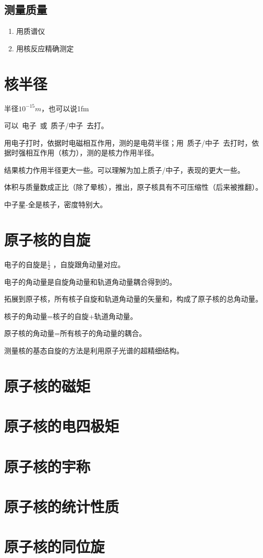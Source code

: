 \subsection{测量质量}

\begin{enumerate}
    \item 用质谱仪
    \item 用核反应精确测定
\end{enumerate}

\section{核半径}

半径$10^{-15}m$，也可以说1fm

可以~电子~或~质子/中子~去打。

用电子打时，依据时电磁相互作用，测的是电荷半径；用~质子/中子~去打时，依据时强相互作用（核力），测的是核力作用半径。
 
结果核力作用半径更大一些。可以理解为加上质子/中子，表现的更大一些。

体积与质量数成正比（除了晕核），推出，原子核具有不可压缩性（后来被推翻）。

中子星-全是核子，密度特别大。

\section{原子核的自旋}

电子的自旋是$\frac{1}{2}$ ，自旋跟角动量对应。

电子的角动量是自旋角动量和轨道角动量耦合得到的。

拓展到原子核，所有核子自旋和轨道角动量的矢量和，构成了原子核的总角动量。

核子的角动量=核子的自旋+轨道角动量。

原子核的角动量=所有核子的角动量的耦合。

测量核的基态自旋的方法是利用原子光谱的超精细结构。

\section{原子核的磁矩}

\section{原子核的电四极矩}

\section{原子核的宇称}

\section{原子核的统计性质}

\section{原子核的同位旋}

\clearpage